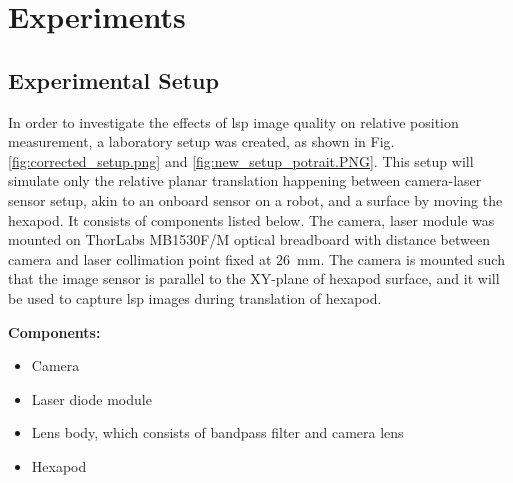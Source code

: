 \chapter{Experiments}

\section{Experimental Setup}

In order to investigate the effects of \gls{lsp} image quality on relative position measurement, a laboratory setup was created, as shown in Fig. \ref{fig:corrected_setup.png} and \ref{fig:new_setup_potrait.PNG}. This setup will simulate only the relative planar translation happening between camera-laser sensor setup, akin to an onboard sensor on a robot, and a surface by moving the hexapod. It consists of components listed below. The camera, laser module was mounted on ThorLabs MB1530F/M optical breadboard with distance between camera and laser collimation point fixed at \SI{26}{\milli\meter}. The camera is mounted such that the image sensor is parallel to the XY-plane of hexapod surface, and it will be used to capture \gls{lsp} images during translation of hexapod.

\vspace{2mm}
\noindent \textbf{Components:}
\begin{itemize}
    \item Camera
    \item Laser diode module
    \item Lens body, which consists of bandpass filter and camera lens
    \item Hexapod
\end{itemize}


